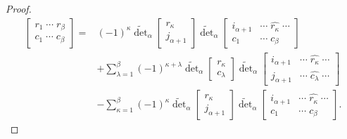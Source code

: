 \documentclass{amsart}
\begin{document}
{{\begin{proof}
\begin{align}
\begin{bmatrix}
                    r_1\;\cdots\;r_\beta\\
                    c_1\;\cdots\;c_\beta
                \end{bmatrix}={}&(-1)^\kappa\widetilde{\det}_\alpha\begin{bmatrix}
                    r_\kappa\\
                    j_{\alpha+1}
                \end{bmatrix}\widetilde{\det}_\alpha\begin{bmatrix}
                    i_{\alpha+1}&\cdots\;\widehat{r_\kappa}\;\cdots\\
                    c_1&\cdots\;c_\beta
                \end{bmatrix}\\
                &+\sum_{\lambda=1}^\beta(-1)^{\kappa+\lambda}\widetilde{\det}_\alpha\begin{bmatrix}
                    r_\kappa\\
                    c_\lambda
                \end{bmatrix}\widetilde{\det}_\alpha\begin{bmatrix}
                    i_{\alpha+1}&\cdots\;\widehat{r_\kappa}\;\cdots\\
                    j_{\alpha+1}&\cdots\;\widehat{c_\lambda}\;\cdots
                \end{bmatrix}\\
                &-\sum_{\kappa=1}^\beta(-1)^\kappa\widetilde{\det}_\alpha\begin{bmatrix}
                    r_\kappa\\
                    j_{\alpha+1}
                \end{bmatrix}\widetilde{\det}_\alpha\begin{bmatrix}
                    i_{\alpha+1}&\cdots\;\widehat{r_\kappa}\;\cdots\\
                    c_1&\cdots\;c_\beta
                \end{bmatrix}.
            \end{align}
        \end{proof}
    }
}

\appendix
\end{document}
